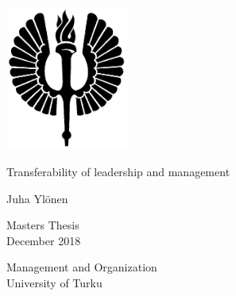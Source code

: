 \documentclass[a4paper,12pt,twoside]{article} %
\begin{document}
\pagestyle{empty}  %

\begin{center}
\includegraphics[width=4cm]{soihtu.png} %
\end{center}

\vspace{3.0cm}
\begin{center}\large
Transferability of leadership and management
\end{center}

\vspace{0.5cm}
\begin{center}
Juha Ylönen
\end{center}

\vspace{0.5cm}
\begin{center}
Masters Thesis\\
December 2018
\end{center}

\vspace{5.0cm}
\begin{center}
Management and Organization\\
University of Turku\\
\end{center}

\cleardoublepage

\addtolength{\oddsidemargin}{-1.1cm}
\addtolength{\voffset}{-2.3cm}
\end{document}
